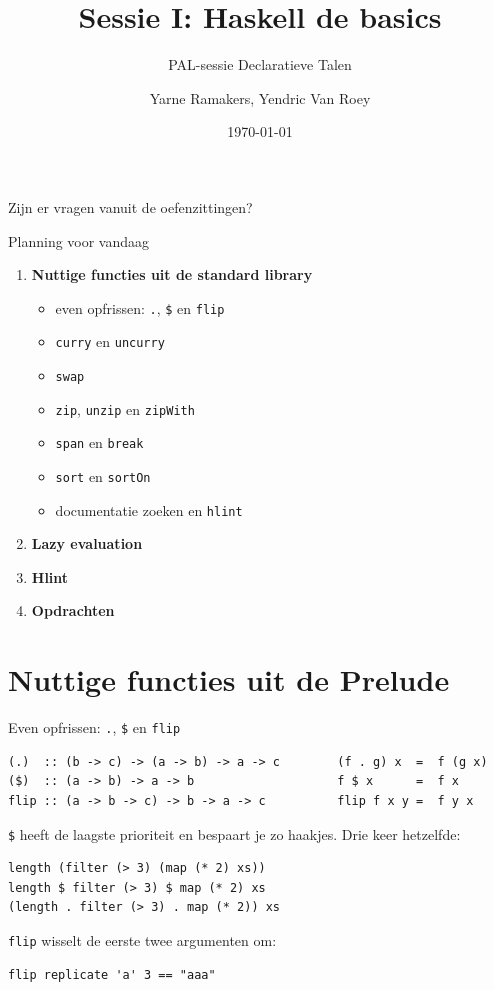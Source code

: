 \documentclass[aspectratio=169,11pt]{beamer}
\title{Sessie I: Haskell de basics}
\subtitle{PAL-sessie Declaratieve Talen}
\author{Yarne Ramakers, Yendric Van Roey}
\institute{KU Leuven}
\date{\today}
\newcommand{\hs}{\lstinline[style=hsinline]}
\begin{document}
 
\maketitle

\begin{frame}[standout]
  Zijn er vragen vanuit de oefenzittingen?
\end{frame}

\begin{frame}{Planning voor vandaag}
  \begin{enumerate}
    \item \textbf{Nuttige functies uit de standard library}
      \begin{itemize}
        \item even opfrissen: \hs|.|, \hs|$| en \hs|flip|
        \item \hs|curry| en \hs|uncurry|
        \item \hs|swap|
        \item \hs|zip|, \hs|unzip| en \hs|zipWith|
        \item \hs|span| en \hs|break|
        \item \hs|sort| en \hs|sortOn|
        \item documentatie zoeken en \hs|hlint|
      \end{itemize}
    \item \textbf{Lazy evaluation}
    \item \textbf{Hlint}
    \item \textbf{Opdrachten}
  \end{enumerate}
\end{frame}

\section{Nuttige functies uit de Prelude}
 
\begin{frame}[fragile]{Even opfrissen: \texttt{.}, \texttt{\$} en \texttt{flip}}
\begin{lstlisting}
(.)  :: (b -> c) -> (a -> b) -> a -> c        (f . g) x  =  f (g x)
($)  :: (a -> b) -> a -> b                    f $ x      =  f x
flip :: (a -> b -> c) -> b -> a -> c          flip f x y =  f y x
\end{lstlisting}
  \hs|$| heeft de \alert{laagste prioriteit} en bespaart je zo haakjes. Drie keer hetzelfde:
\begin{lstlisting}
length (filter (> 3) (map (* 2) xs))
length $ filter (> 3) $ map (* 2) xs
(length . filter (> 3) . map (* 2)) xs
\end{lstlisting}
  \hs|flip| wisselt de eerste twee argumenten om:
\begin{lstlisting}
flip replicate 'a' 3 == "aaa"
\end{lstlisting}
\end{frame}
\end{document}
